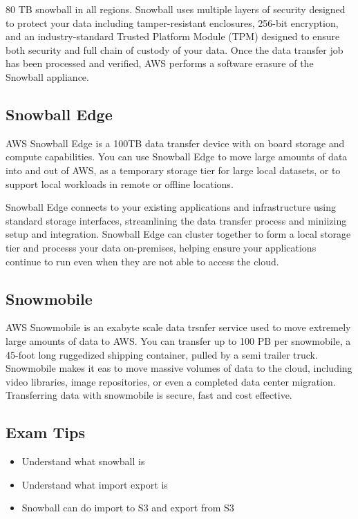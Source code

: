 \documentclass{article}
\begin{document}
80 TB snowball in all regions. Snowball uses multiple layers of security designed to protect your data including tamper-resistant enclosures, 256-bit encryption, and an industry-standard Trusted Platform Module (TPM) designed to ensure both security and full chain of custody of your data. Once the data transfer job has been processed and verified, AWS performs a software erasure of the Snowball appliance.

\subsection{Snowball Edge}
AWS Snowball Edge is a 100TB data transfer device with on board storage and compute capabilities. You can use Snowball Edge to move large amounts of data into and out of AWS, as a temporary storage tier for large local datasets, or to support local workloads in remote or offline locations.

Snowball Edge connects to your existing applications and infrastructure using standard storage interfaces, streamlining the data transfer process and miniizing setup and integration. Snowball Edge can cluster together to form a local storage tier and processs your data on-premises, helping ensure your applications continue to run even when they are not able to access the cloud.

\subsection{Snowmobile}
AWS Snowmobile is an exabyte scale data trsnfer service used to move extremely large amounts of data to AWS. You can transfer up to 100 PB per snowmobile, a 45-foot long ruggedized shipping container, pulled by a semi trailer truck. Snowmobile makes it eas to move massive volumes of data to the cloud, including video libraries, image repositories, or even a completed data center migration. Transferring data with snowmobile is secure, fast and cost effective.

\subsection*{Exam Tips}
\begin{itemize}
\item
Understand what snowball is

\item
Understand what import export is

\item
Snowball can do import to S3 and export from S3

\end{itemize}
\end{document}
